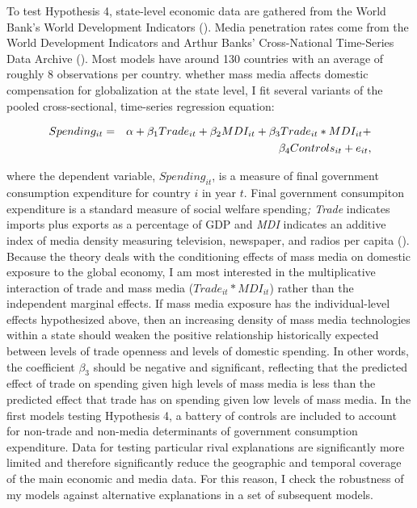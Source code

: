 \documentclass[12pt]{report}
\begin{document}
To test Hypothesis 4, state-level economic data are gathered from the World Bank's World Development
Indicators (\citealt{WorldDevelopmentIn:2012wl}). Media penetration rates come from the World
Development Indicators and Arthur Banks' Cross-National Time-Series Data Archive
(\citealt{CrossNationalTime:td,WorldDevelopmentIn:2012wl}). Most models have around 130 countries
with an average of roughly 8 observations per country.%
whether mass media affects domestic compensation for globalization at the state level, I fit several
variants of the pooled cross-sectional, time-series regression equation:

\begin{eqnarray} Spending_{it}& =
&\alpha+\beta_{1}Trade_{it}+\beta_{2}MDI_{it}+\beta_{3}Trade_{it}*MDI_{it}+ \notag \\ &  &
\beta_{4}Controls_{it}+e_{it}, \end{eqnarray}

\noindent where the dependent variable, $Spending_{it}$, is a measure of final government
consumption expenditure for country $i$ in year $t$. Final government consumpiton expenditure is a
standard measure of social welfare spending\emph{; Trade} indicates imports plus exports as a
percentage of GDP and \emph{MDI} indicates an additive index of media density measuring television,
newspaper, and radios per capita (\citealt{Camber:2013ul}). Because the theory deals with the
conditioning effects of mass media on domestic exposure to the global economy, I am most interested
in the multiplicative interaction of trade and mass media ($Trade_{it}*MDI_{it}$) rather than the
independent marginal effects. If mass media exposure has the individual-level effects hypothesized
above, then an increasing density of mass media technologies within a state should weaken the
positive relationship historically expected between levels of trade openness and levels of domestic
spending. In other words, the coefficient $\beta_{3}$ should be negative and significant, reflecting
that the predicted effect of trade on spending given high levels of mass media is less than the
predicted effect that trade has on spending given low levels of mass media. In the first models
testing Hypothesis 4, a battery of controls are included to account for non-trade and non-media
determinants of government consumption expenditure. Data for testing particular rival explanations
are significantly more limited and therefore significantly reduce the geographic and temporal
coverage of the main economic and media data. For this reason, I check the robustness of my models
against alternative explanations in a set of subsequent models.
\end{document}
